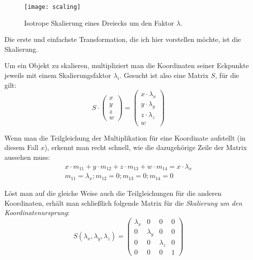 \begin{wrapfigure}{R}{0.5\textwidth}
  \vspace{-10pt}
  \texttt{[image: scaling]}
  \vspace{-10pt}
  \caption{Isotrope Skalierung eines Dreiecks um den Faktor $\lambda$.}
\end{wrapfigure}

Die erste und einfachste Transformation, die ich hier vorstellen möchte, ist die Skalierung.

Um ein Objekt zu skalieren, multipliziert man die Koordinaten seiner Eckpunkte jeweils mit einem Skalierungsfaktor $\lambda_i$. Gesucht ist also eine Matrix $S$, für die gilt:
\begin{equation}
 S \cdot
 \begin{pmatrix}
  x \\
  y \\
  z \\
  w
 \end{pmatrix}
 =
 \begin{pmatrix}
  x \cdot \lambda_x \\
  y \cdot \lambda_y \\
  z \cdot \lambda_z \\
  w
 \end{pmatrix}
\end{equation}

Wenn man die Teilgleichung der Multiplikation für eine Koordinate aufstellt (in diesem Fall $x$), erkennt man recht schnell, wie die dazugehörige Zeile der Matrix aussehen muss:
\begin{equation}
\begin{split}
 x \cdot m_{11} + y \cdot m_{12} + z \cdot m_{13} + w \cdot m_{14} = x \cdot \lambda_x \\
 m_{11} = \lambda_x; m_{12} = 0; m_{13} = 0; m_{14} = 0
\end{split}
\end{equation}

Löst man auf die gleiche Weise auch die Teilgleichungen für die anderen Koordinaten, erhält man schließlich folgende Matrix für die \emph{Skalierung um den Koordinatenursprung}:
\begin{equation}
\label{scalingmatrix}
 S{(\lambda_x, \lambda_y, \lambda_z)} =
 \begin{pmatrix}
  \lambda_x & 0 & 0 & 0 \\
  0 & \lambda_y & 0 & 0 \\
  0 & 0 & \lambda_z & 0 \\
  0 & 0 & 0 & 1
 \end{pmatrix}
\end{equation}

